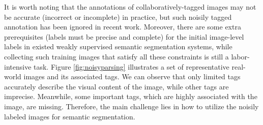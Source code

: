 It is worth noting that the annotations of collaboratively-tagged images may not be accurate (incorrect or incomplete) in practice, but such noisily tagged annotation has been ignored in recent work. Moreover, there are some extra prerequisites (\eg labels must be precise and complete) for the initial image-level labels in existed weakly supervised semantic segmentation systems, while collecting such training images that satisfy all these constraints is still a labor-intensive task. Figure \ref{fig:noisyparsing} illustrates a set of representative real-world images and its associated tags. We can observe that only limited tags accurately describe the visual content of the image, while other tags are imprecise. Meanwhile, some important tags, which are highly associated with the image, are missing. Therefore, the main challenge lies in how to utilize the noisily labeled images for semantic segmentation.
\fi

